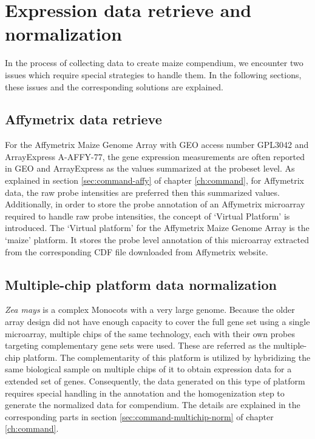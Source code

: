 \section{Expression data retrieve and normalization}\label{apd:magic-datanorm}

In the process of collecting data to create maize compendium, we encounter two issues which require special strategies to handle them. In the following sections, these issues and the corresponding solutions are explained.

\subsection{Affymetrix data retrieve}

For the Affymetrix Maize Genome Array with GEO access number GPL3042 and ArrayExpress A-AFFY-77, the gene expression measurements are often reported in GEO and ArrayExpress as the values summarized at the probeset level. As explained in section \ref{sec:command-affy} of chapter \ref{ch:command}, for Affymetrix data, the raw probe intensities are preferred then this summarized values. Additionally, in order to store the probe annotation of an Affymetrix microarray required to handle raw probe intensities, the concept of `Virtual Platform' is introduced. The `Virtual platform' for the Affymetrix Maize Genome Array is the `maize' platform.  It stores the probe level annotation of this microarray extracted from the corresponding CDF file downloaded from Affymetrix website.


\subsection{Multiple-chip platform data normalization}

\textit{Zea mays} is a complex Monocots with a very large genome. Because the older array design did not have enough capacity to cover the full gene set using a single microarray, multiple chips of the same technology, each with their own probes targeting complementary gene sets were used.  These are referred as the multiple-chip platform. The complementarity of this platform is utilized by hybridizing the same biological sample on multiple chips of it to obtain expression data for a extended set of genes. Consequently, the data generated on this type of platform requires special handling in the annotation and the homogenization step to generate the normalized data for compendium. The details are explained in the corresponding parts in section \ref{sec:command-multichip-norm} of chapter \ref{ch:command}.




